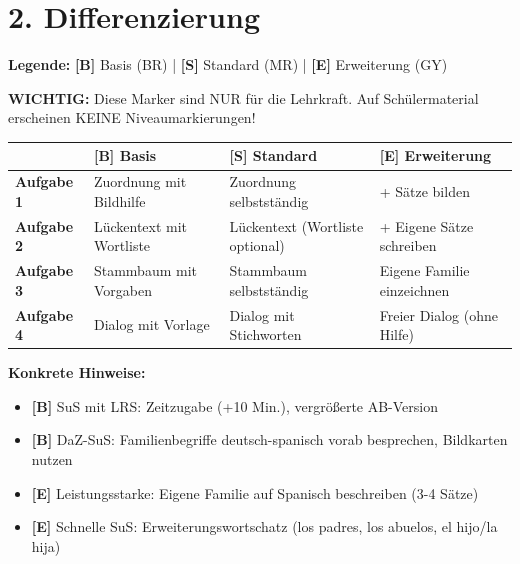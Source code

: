 \documentclass[11pt, a4paper]{article}
\newcommand{\B}{\textcolor{basis}{\textbf{[B]}}}
\newcommand{\Std}{\textcolor{standard}{\textbf{[S]}}}
\newcommand{\E}{\textcolor{erweiterung}{\textbf{[E]}}}
\begin{document}

\section*{2. Differenzierung}

\begin{differenzierung}
\textbf{Legende:} \B{} Basis (BR) | \Std{} Standard (MR) | \E{} Erweiterung (GY)

\vspace{0.5em}

\textbf{WICHTIG:} Diese Marker sind NUR für die Lehrkraft. Auf Schülermaterial erscheinen KEINE Niveaumarkierungen!
\end{differenzierung}

\vspace{1em}

\begin{tabularx}{\textwidth}{|l|X|X|X|}
\hline
& \B{} \textbf{Basis} & \Std{} \textbf{Standard} & \E{} \textbf{Erweiterung} \\
\hline
\textbf{Aufgabe 1} & Zuordnung mit Bildhilfe & Zuordnung selbstständig & + Sätze bilden \\
\hline
\textbf{Aufgabe 2} & Lückentext mit Wortliste & Lückentext (Wortliste optional) & + Eigene Sätze schreiben \\
\hline
\textbf{Aufgabe 3} & Stammbaum mit Vorgaben & Stammbaum selbstständig & Eigene Familie einzeichnen \\
\hline
\textbf{Aufgabe 4} & Dialog mit Vorlage & Dialog mit Stichworten & Freier Dialog (ohne Hilfe) \\
\hline
\end{tabularx}

\vspace{1em}

\textbf{Konkrete Hinweise:}
\begin{itemize}
    \item \B{} SuS mit LRS: Zeitzugabe (+10 Min.), vergrößerte AB-Version
    \item \B{} DaZ-SuS: Familienbegriffe deutsch-spanisch vorab besprechen, Bildkarten nutzen
    \item \E{} Leistungsstarke: Eigene Familie auf Spanisch beschreiben (3-4 Sätze)
    \item \E{} Schnelle SuS: Erweiterungswortschatz (los padres, los abuelos, el hijo/la hija)
\end{itemize}
\end{document}
